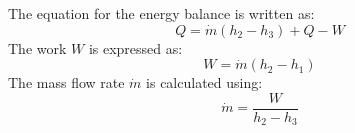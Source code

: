 The equation for the energy balance is written as:  
\[
Q = \dot{m} (h_2 - h_3) + Q - W
\]  
The work \( W \) is expressed as:  
\[
W = \dot{m} (h_2 - h_1)
\]  
The mass flow rate \( \dot{m} \) is calculated using:  
\[
\dot{m} = \frac{W}{h_2 - h_3}
\]